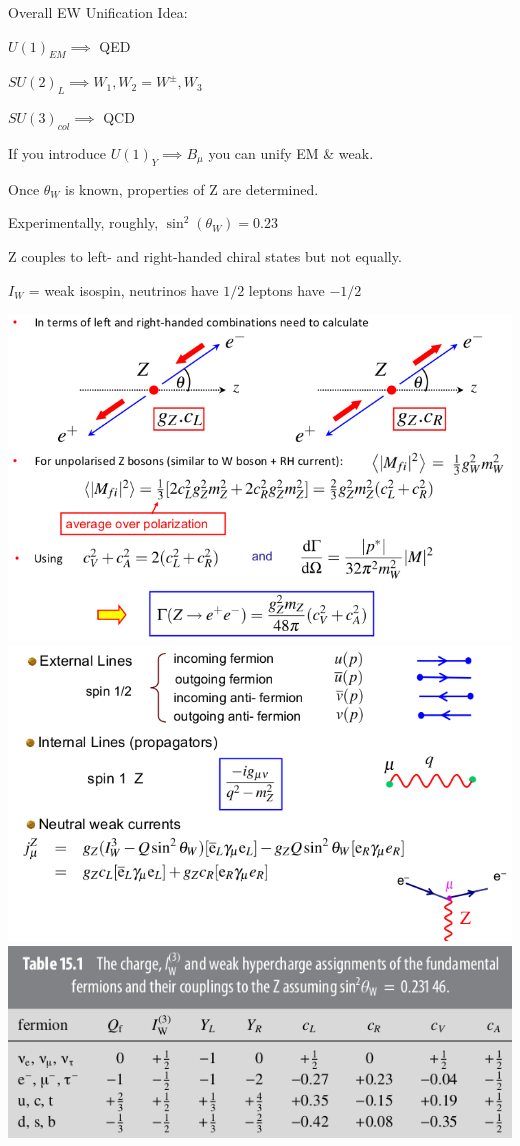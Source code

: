 Overall EW Unification Idea:

$U(1)_{EM} \implies$ QED

$SU(2)_{L} \implies W_1, W_2 = W^\pm, W_3$

$SU(3)_{col} \implies$ QCD

If you introduce $U(1)_Y \implies B_\mu$ you can unify EM \& weak.

Once $\theta_W$ is known, properties of Z are determined.

Experimentally, roughly, $\sin^2(\theta_W) = 0.23$

Z couples to left- and right-handed chiral states but not equally.

$I_W$ = weak isospin, neutrinos have $1/2$ leptons have $-1/2$

\begin{center}
    \includegraphics[width=\linewidth]{images/z_decays.png}
    \includegraphics[width=\linewidth]{images/neutral_current_feynrules.png}
    \includegraphics[width=\linewidth]{images/z_coupling_params.png}
\end{center}

